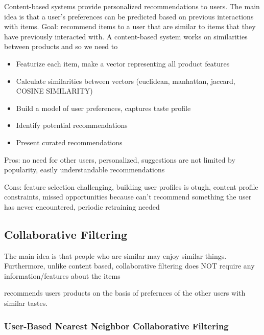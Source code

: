 \documentclass[12pt]{scrartcl}
\begin{document}
\begin{definition}
  Content-based systems provide personalized recommendations to users. The main idea 
  is that a user's preferences can be predicted based on previous interactions 
  with items. Goal: recommend items to a user that are similar to items that they have 
  previously interacted with. A content-based system works on similarities between products and so we need 
  to 
  \begin{itemize}
    \item Featurize each item, make a vector representing all product features
    \item Calculate similarities between vectors (euclidean, manhattan, jaccard, COSINE SIMILARITY)
    \item Build a model of user preferences, captures taste profile
    \item Identify potential recommendations
    \item Present curated recommendations
  \end{itemize}

  Pros: no need for other users, personalized, suggestions are not limited by popularity, easily 
  understandable recommendations

  Cons: feature selection challenging, building user profiles is otugh, content profile constraints, 
  missed opportunities because can't recommend something the user has never encountered, periodic retraining needed
\end{definition}

\subsection{Collaborative Filtering}

\begin{note}
  The main idea is that people who are similar may enjoy similar things. 
  Furthermore, unlike content based, collaborative filtering does NOT require any information/features 
  about the items
\end{note}

\begin{definition}
   recommends users products on the basis of prefernces 
  of the other users with similar tastes.
\end{definition}

\subsubsection{User-Based Nearest Neighbor Collaborative Filtering}
\end{document}

